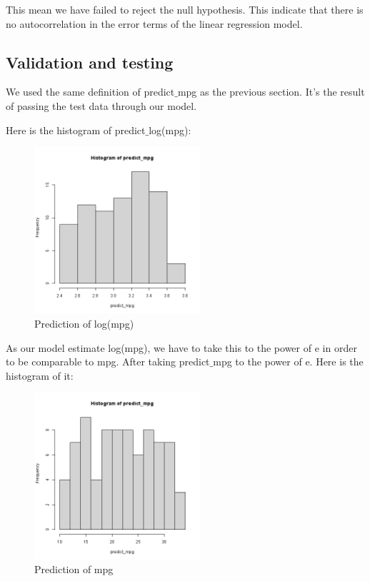 This mean we have failed to reject the null hypothesis. This indicate that there is no autocorrelation in the error terms of the linear regression model.

\subsection{Validation and testing}

We used the same definition of predict$\_$mpg as the previous section. It's the result of passing the test data through our model.

Here is the histogram of predict$\_$log(mpg):


\begin{figure}[H]
\centering
\includegraphics[width=0.55\textwidth]{img/predictmpghist1.png}
\caption{Prediction of log(mpg)}
\label{fig:scaled_revenue_distribution}
\end{figure}

As our model estimate log(mpg), we have to take this to the power of e in order to be comparable to mpg. After taking predict$\_$mpg to the power of e. Here is the histogram of it:

\begin{figure}[H]
\centering
\includegraphics[width=0.55\textwidth]{img/predictmpghist2.png}
\caption{Prediction of mpg}
\label{fig:scaled_revenue_distribution}
\end{figure}

